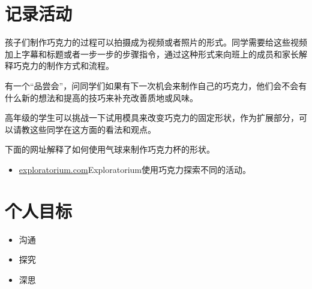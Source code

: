 \section{记录活动}
    孩子们制作巧克力的过程可以拍摄成为视频或者照片的形式。同学需要给这些视频加上字幕和标题或者一步一步的步骤指令，通过这种形式来向班上的成员和家长解释巧克力的制作方式和流程。\par
    有一个“品尝会”，问同学们如果有下一次机会来制作自己的巧克力，他们会不会有什么新的想法和提高的技巧来补充改善质地或风味。\par
    高年级的学生可以挑战一下试用模具来改变巧克力的固定形状，作为扩展部分，可以请教这些同学在这方面的看法和观点。\par
    下面的网址解释了如何使用气球来制作巧克力杯的形状。\par
    \begin{itemize}
      \item \href{http://www.exploratorium.edu/exploring/exploring_chocolate/activity.html}{exploratorium.com}Exploratorium使用巧克力探索不同的活动。
    \end{itemize}  



\section{个人目标}
  \begin{itemize}
    \item 沟通
    \item 探究
    \item 深思  
  \end{itemize}  
